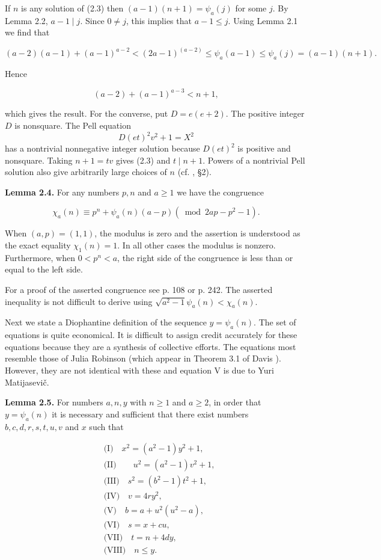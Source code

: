 \documentclass[10pt,letterpaper]{article}
\newcommand{\origpage}[1]{\marginnote{\footnotesize\textbf{[#1]}}}
\newcommand{\statement}[1]{\par\medskip\noindent\textbf{#1}\enspace}
\begin{document}
If $n$ is any solution of (2.3) then $(a-1)(n+1)=\psi_{a}(j)$ for some $j$. By Lemma 2.2, $a-1 \mid j$. Since $0 \neq j$, this implies that $a-1 \leq j$. Using Lemma 2.1 we find that

\[
(a-2)(a-1)+(a-1)^{a-2}<(2 a-1)^{(a-2)} \leq \psi_{a}(a-1) \leq \psi_{a}(j)=(a-1)(n+1) .
\]

Hence

\[
(a-2)+(a-1)^{a-3}<n+1,
\]

\origpage{452}which gives the result. For the converse, put $D=e(e+2)$. The positive integer $D$ is nonsquare.
The Pell equation
\[
D(et)^2v^2+1=X^2
\]
has a nontrivial nonnegative integer solution because $D(et)^2$ is positive and nonsquare.
Taking $n+1=tv$ gives (2.3) and $t\mid n+1$.
Powers of a nontrivial Pell solution also give arbitrarily large choices of $n$
(cf. \cite{ref11}, \S2).

\statement{Lemma 2.4.} For any numbers $p, n$ and $a \geq 1$ we have the congruence

\[
\chi_{a}(n) \equiv p^{n}+\psi_{a}(n)(a-p)\left(\bmod 2 a p-p^{2}-1\right) .
\]

When $(a,p)=(1,1)$, the modulus is zero and the assertion is understood as the exact equality $\chi_1(n)=1$. In all other cases the modulus is nonzero. Furthermore, when $0<p^{n}<a$, the right side of the congruence is less than or equal to the left side.


For a proof of the asserted congruence see \cite{ref16} p. 108 or \cite{ref3} p. 242. The asserted inequality is not difficult to derive using $\sqrt{a^{2}-1} \psi_{a}(n)<\chi_{a}(n)$.

Next we state a Diophantine definition of the sequence $y=\psi_{a}(n)$. The set of equations is quite economical. It is difficult to assign credit accurately for these equations because they are a synthesis of collective efforts. The equations most resemble those of Julia Robinson (which appear in Theorem 3.1 of Davis \cite{ref3}). However, they are not identical with these and equation V is due to Yuri Matijasevič.

\statement{Lemma 2.5.} For numbers $a,n,y$ with $n\geq1$ and $a\geq2$, in order that $y=\psi_{a}(n)$ it is necessary and sufficient that there exist numbers $b, c, d, r, s, t, u, v$ and $x$ such that

\begin{align*}
&\text{(I)}\quad x^{2}=\left(a^{2}-1\right) y^{2}+1,\\
&\text{(II)}\quad \quad u^{2}=\left(a^{2}-1\right) v^{2}+1,\\
&\text{(III)}\quad s^{2}=\left(b^{2}-1\right) t^{2}+1,\\
&\text{(IV)}\quad v=4 r y^{2},\\
&\text{(V)}\quad b=a+u^{2}\left(u^{2}-a\right),\\
&\text{(VI)}\quad s=x+c u,\\
&\text{(VII)}\quad t=n+4 d y,\\
&\text{(VIII)}\quad n \leq y.
\end{align*}
\end{document}
